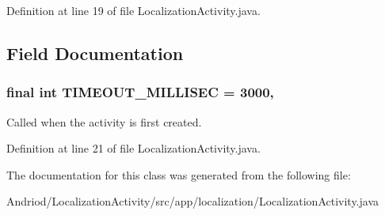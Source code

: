 Definition at line 19 of file Localization\-Activity.\-java.



\subsection{Field Documentation}
\hypertarget{classapp_1_1localization_1_1_localization_activity_af5858805af6e7dae14f55e3f4d0e0f9e}{
\subsubsection[{T\-I\-M\-E\-O\-U\-T\-\_\-\-M\-I\-L\-L\-I\-S\-E\-C}]{\setlength{\rightskip}{0pt plus 5cm}final int T\-I\-M\-E\-O\-U\-T\-\_\-\-M\-I\-L\-L\-I\-S\-E\-C = 3000\hspace{0.3cm}{\ttfamily [static]}, {\ttfamily [protected]}}}\label{classapp_1_1localization_1_1_localization_activity_af5858805af6e7dae14f55e3f4d0e0f9e}
Called when the activity is first created. 

Definition at line 21 of file Localization\-Activity.\-java.



The documentation for this class was generated from the following file\-:\begin{DoxyCompactItemize}
\item 
Andriod/\-Localization\-Activity/src/app/localization/Localization\-Activity.\-java\end{DoxyCompactItemize}
